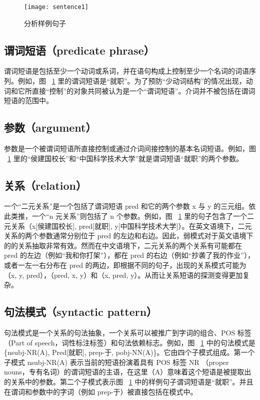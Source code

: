 \begin{figure}[ht]
\centering
\texttt{[image: sentence1]}
\caption{分析样例句子}\label{fig:sentence1}
\end{figure}

\subsection{谓词短语（predicate phrase）}
谓词短语是包括至少一个动词或系词，并在语句构成上控制至少一个名词的词语序列。例如，图 ~\ref{fig:sentence1} 里的谓词短语是“就职”。为了预防“少动词结构”的情况出现，动词和它所直接“控制”的对象共同被认为是一个“谓词短语”。介词并不被包括在谓词短语的范围中。

\subsection{参数（argument）}
参数是一个被谓词短语所直接控制或通过介词间接控制的基本名词短语。例如，图 ~\ref{fig:sentence1} 里的“侯建国校长”和“中国科学技术大学”就是谓词短语“就职”的两个参数。

\subsection{关系（relation）}
一个“二元关系”是一个包括了谓词短语 pred 和它的两个参数 x 与 y 的三元组。依此类推，一个“n 元关系”则包括了 n 个参数。例如，图 ~\ref{fig:sentence1} 里的句子包含了一个二元关系（x[侯建国校长], pred[就职], y[中国科学技术大学]）。在英文语境下，二元关系的两个参数通常分别位于 pred 的左边和右边。因此，弱模式对于英文语境下的的关系抽取非常有效。然而在中文语境下，二元关系的两个关系有可能都在 pred 的左边（例如“我和你打架”），都在 pred 的右边（例如“抄袭了我的作业”），或者一左一右分布在 pred 的两边，即根据不同的句子，出现的关系模式可能为（x, y, pred），（pred, x, y）和（x, pred, y）。从而让关系短语的探测变得更加复杂。

\subsection{句法模式（syntactic pattern）}
句法模式是一个关系的句法抽象，一个关系可以被推广到字词的组合、POS 标签（Part of speech，词性标注标签）和句法依赖标志。例如，图 ~\ref{fig:sentence1} 中的句法模式是\{nsubj-NR(A), Pred[就职], prep-于, pobj-NN(A)\}。它由四个子模式组成。第一个子模式 nsubj-NR(A) 表示当前的短语扮演着具有 POS 标签 NR （proper nouns，专有名词）的谓词短语的主语，在这里（A）意味着这个短语是被提取出的关系中的参数。第二个子模式表示图 ~\ref{fig:sentence1} 中的样例句子谓词短语是“就职”。并且在谓词和参数中的字词（例如 prep-于）被直接包括在模式中。

